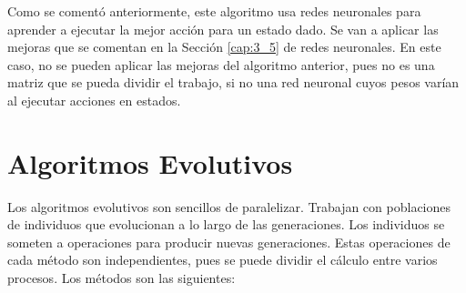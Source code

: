 			
		
		Como se comentó anteriormente, este algoritmo usa redes neuronales para aprender a ejecutar la mejor acción para un estado dado. Se van a aplicar las mejoras que se comentan en la Sección \ref{cap:3_5} de redes neuronales. En este caso, no se pueden aplicar las mejoras del algoritmo anterior, pues no es una matriz que se pueda dividir el trabajo, si no una red neuronal cuyos pesos varían al ejecutar acciones en estados. 	
		
		
	
		
	
	


\section{Algoritmos Evolutivos}
	\label{cap:3_4}
	Los algoritmos evolutivos son sencillos de paralelizar. Trabajan con poblaciones de individuos que evolucionan a lo largo de las generaciones. Los individuos se someten a operaciones para producir nuevas generaciones. Estas operaciones de cada método son independientes, pues se puede dividir el cálculo entre varios procesos. Los métodos son las siguientes: 
	

